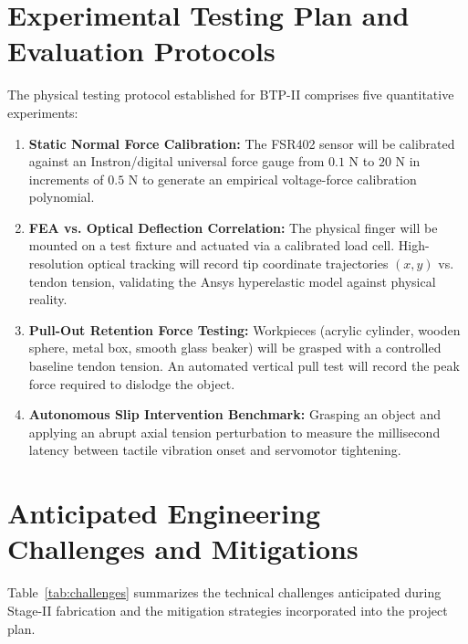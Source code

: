 \documentclass[12pt,a4paper]{report}
\begin{document}
\section{Experimental Testing Plan and Evaluation Protocols}
The physical testing protocol established for BTP-II comprises five quantitative experiments:
\begin{enumerate}
    \item \textbf{Static Normal Force Calibration:} The FSR402 sensor will be calibrated against an Instron/digital universal force gauge from $0.1\text{ N}$ to $20\text{ N}$ in increments of $0.5\text{ N}$ to generate an empirical voltage-force calibration polynomial.
    \item \textbf{FEA vs. Optical Deflection Correlation:} The physical finger will be mounted on a test fixture and actuated via a calibrated load cell. High-resolution optical tracking will record tip coordinate trajectories $(x, y)$ vs. tendon tension, validating the Ansys hyperelastic model against physical reality.
    \item \textbf{Pull-Out Retention Force Testing:} Workpieces (acrylic cylinder, wooden sphere, metal box, smooth glass beaker) will be grasped with a controlled baseline tendon tension. An automated vertical pull test will record the peak force required to dislodge the object.
    \item \textbf{Autonomous Slip Intervention Benchmark:} Grasping an object and applying an abrupt axial tension perturbation to measure the millisecond latency between tactile vibration onset and servomotor tightening.
\end{enumerate}

\section{Anticipated Engineering Challenges and Mitigations}
Table~\ref{tab:challenges} summarizes the technical challenges anticipated during Stage-II fabrication and the mitigation strategies incorporated into the project plan.
\end{document}
